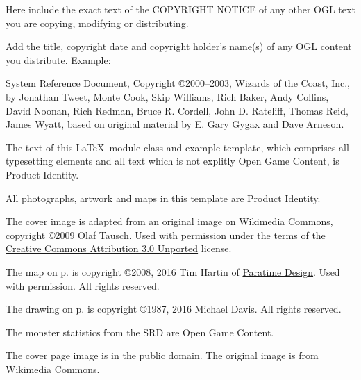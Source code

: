 \documentclass[a4paper,serif]{module}       %
\begin{document}
\begin{ogl}
\item Here include the exact text of the COPYRIGHT NOTICE of any other OGL text you are copying, modifying or distributing.
\item Add the title, copyright date and copyright holder's name(s) of any OGL content you distribute. Example:
\item System Reference Document, Copyright \copyright 2000--2003, Wizards of the Coast, Inc., by Jonathan Tweet, Monte Cook, Skip Williams, Rich Baker, Andy Collins,
David Noonan, Rich Redman, Bruce R. Cordell, John D. Rateliff, Thomas Reid, James Wyatt, based on original material by E. Gary Gygax and Dave Arneson.
\end{ogl}

\begin{productidentity}
\item The text of this \LaTeX~module class and example template, which comprises all typesetting elements and all text which is not explitly Open Game Content, is Product Identity.
\modulecopyright

\item All photographs, artwork and maps in this template are Product Identity.

\item The cover image is adapted from an original image on \href{https://commons.wikimedia.org/wiki/File:Karnak_Tempel_Vorhof_05.jpg}{Wikimedia Commons},
copyright \copyright 2009 Olaf Tausch. Used with permission under the terms of the
\href{https://creativecommons.org/licenses/by/3.0/deed.en}{Creative Commons Attribution 3.0 Unported} license.

\item The map on p.\pageref{img:map} is copyright \copyright 2008, 2016 Tim Hartin of \href{http://paratime.ca}{Paratime Design}. Used with permission. All rights reserved.

\item The drawing on p.\pageref{img:tomb} is copyright \copyright 1987, 2016 Michael Davis. All rights reserved.

\end{productidentity}

\begin{opengamecontent}
\item The monster statistics from the SRD are Open Game Content.
\item The cover page image is in the public domain. The original image is from 
\href{https://commons.wikimedia.org/wiki/File:The_Great_Pyramid_and_the_Sphinx.jpg}{Wikimedia Commons}.
\end{opengamecontent}


\tableofcontents

\end{document}
